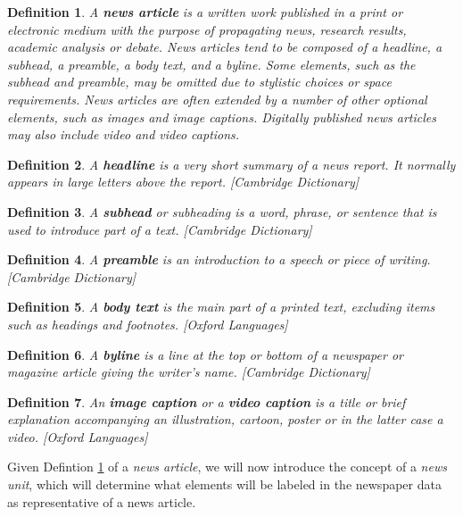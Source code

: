 \documentclass[english, bibtex]{kththesis}
\begin{document}
\newtheorem{thm}{Theorem}
\newtheorem{defn}[thm]{Definition}
\begin{defn}
\label{newsarticle}
A \textbf{news article} is a written work published in a print or electronic medium with the purpose of propagating news, research results, academic analysis or debate. News articles tend to be composed of a headline, a subhead, a preamble, a body text, and a byline. Some elements, such as the subhead and preamble, may be omitted due to stylistic choices or space requirements. News articles are often extended by a number of other optional elements, such as images and image captions. Digitally published news articles may also include video and video captions.
\end{defn}

\begin{defn}
\label{headline}
A \textbf{headline} is a very short summary of a news report. It normally appears in large letters above the report. [Cambridge Dictionary]
\end{defn}

\begin{defn}
\label{subhead}
A \textbf{subhead} or subheading is a word, phrase, or sentence that is used to introduce part of a text. [Cambridge Dictionary]
\end{defn}

\begin{defn}
\label{preamble}
A \textbf{preamble} is an introduction to a speech or piece of writing. [Cambridge Dictionary]
\end{defn}

\begin{defn}
\label{body text}
A \textbf{body text} is the main part of a printed text, excluding items such as headings and footnotes. [Oxford Languages]
\end{defn}

\begin{defn}
\label{byline}
A \textbf{byline} is a line at the top or bottom of a newspaper or magazine article giving the writer's name. [Cambridge Dictionary]
\end{defn}

\begin{defn}
\label{img}
An \textbf{image caption} or a \textbf{video caption} is a title or brief explanation accompanying an illustration, cartoon, poster or in the latter case a video. [Oxford Languages]
\end{defn}

Given Defintion \ref{newsarticle} of a \textit{news article}, we will now introduce the concept of a \textit{news unit}, which will determine what elements will be labeled in the newspaper data as representative of a news article.
\end{document}
